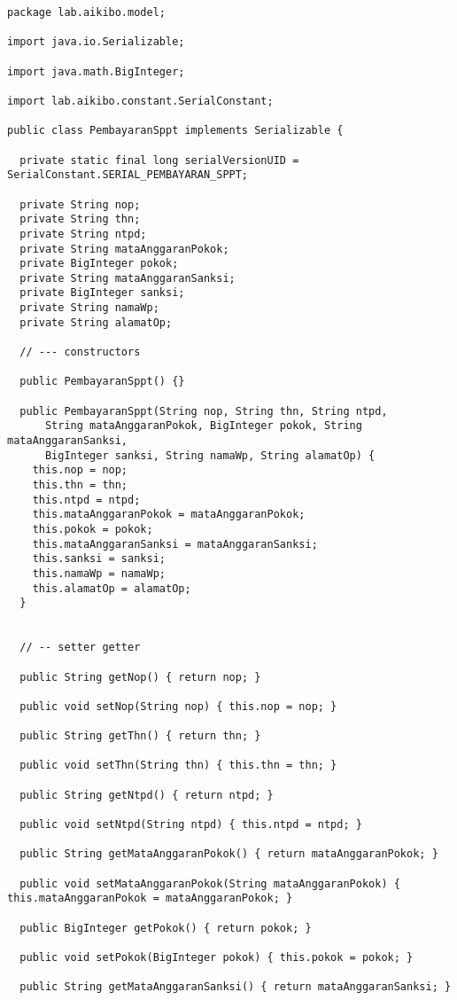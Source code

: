 \documentclass[pdftex,12pt, oneside]{article}
\begin{document}
\begin{lstlisting}
package lab.aikibo.model;

import java.io.Serializable;

import java.math.BigInteger;

import lab.aikibo.constant.SerialConstant;

public class PembayaranSppt implements Serializable {

  private static final long serialVersionUID = SerialConstant.SERIAL_PEMBAYARAN_SPPT;

  private String nop;
  private String thn;
  private String ntpd;
  private String mataAnggaranPokok;
  private BigInteger pokok;
  private String mataAnggaranSanksi;
  private BigInteger sanksi;
  private String namaWp;
  private String alamatOp;

  // --- constructors

  public PembayaranSppt() {}

  public PembayaranSppt(String nop, String thn, String ntpd,
      String mataAnggaranPokok, BigInteger pokok, String mataAnggaranSanksi,
      BigInteger sanksi, String namaWp, String alamatOp) {
    this.nop = nop;
    this.thn = thn;
    this.ntpd = ntpd;
    this.mataAnggaranPokok = mataAnggaranPokok;
    this.pokok = pokok;
    this.mataAnggaranSanksi = mataAnggaranSanksi;
    this.sanksi = sanksi;
    this.namaWp = namaWp;
    this.alamatOp = alamatOp;
  }


  // -- setter getter

  public String getNop() { return nop; }

  public void setNop(String nop) { this.nop = nop; }

  public String getThn() { return thn; }

  public void setThn(String thn) { this.thn = thn; }

  public String getNtpd() { return ntpd; }

  public void setNtpd(String ntpd) { this.ntpd = ntpd; }

  public String getMataAnggaranPokok() { return mataAnggaranPokok; }

  public void setMataAnggaranPokok(String mataAnggaranPokok) { this.mataAnggaranPokok = mataAnggaranPokok; }

  public BigInteger getPokok() { return pokok; }

  public void setPokok(BigInteger pokok) { this.pokok = pokok; }

  public String getMataAnggaranSanksi() { return mataAnggaranSanksi; }


\end{lstlisting}
\end{document}
